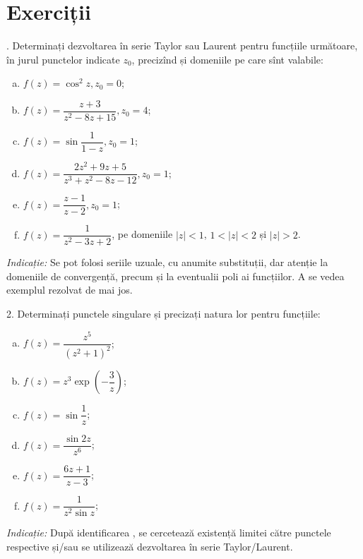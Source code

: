 \section{Exerciții}

\indent{}. Determinați dezvoltarea în serie Taylor sau Laurent pentru funcțiile următoare,
în jurul punctelor indicate $ z_0 $, precizînd și domeniile pe care sînt valabile:
\begin{enumerate}[(a)]
\item $ f(z) = \cos^2 z, z_0 = 0 $;
\item $ f(z) = \dfrac{z + 3}{z^2 - 8z + 15}, z_0 = 4 $;
\item $ f(z) = \sin \dfrac{1}{1 - z}, z_0 = 1 $;
\item $ f(z) = \dfrac{2z^2 + 9z + 5}{z^3 + z^2 - 8z - 12}, z_0 = 1 $;
\item $ f(z) = \dfrac{z - 1}{z - 2}, z_0 = 1 $;
\item $ f(z) = \dfrac{1}{z^2 - 3z + 2} $, pe domeniile $ |z| < 1 $,
  $ 1 < |z| < 2 $ și $ |z| > 2 $.
\end{enumerate}

\emph{Indicație:} Se pot folosi seriile uzuale, cu anumite substituții,
dar atenție la domeniile de convergență, precum și la eventualii poli ai
funcțiilor. A se vedea exemplul rezolvat de mai jos.

\vspace{0.3cm}

2. Determinați punctele singulare și precizați natura lor pentru funcțiile:
\begin{enumerate}[(a)]
\item $ f(z) = \dfrac{z^5}{(z^2 + 1)^2} $;
\item $ f(z) = z^3 \exp\left( -\dfrac{3}{z} \right) $;
\item $ f(z) = \sin \dfrac{1}{z} $;
\item $ f(z) = \dfrac{\sin 2z}{z^6} $;
\item $ f(z) = \dfrac{6z + 1}{z - 3} $;
\item $ f(z) = \dfrac{1}{z^2 \sin z} $;
\end{enumerate}

\emph{Indicație:} După identificarea , se cercetează
existență limitei către punctele respective și/sau se utilizează dezvoltarea
în serie Taylor/Laurent.

\vspace{0.3cm}


